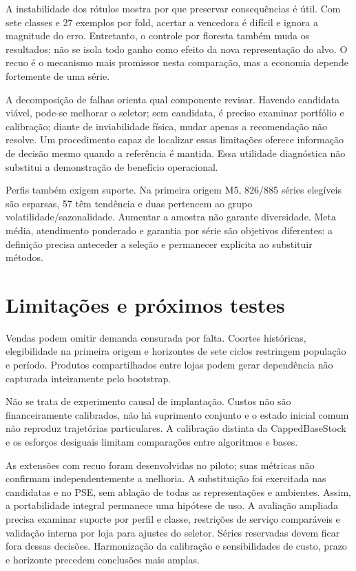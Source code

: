 \documentclass[preprint,12pt]{elsarticle}
\begin{document}
A instabilidade dos rótulos mostra por que preservar consequências é útil. Com sete classes e 27 exemplos por fold, acertar a vencedora é difícil e ignora a magnitude do erro. Entretanto, o controle por floresta também muda os resultados: não se isola todo ganho como efeito da nova representação do alvo. O recuo é o mecanismo mais promissor nesta comparação, mas a economia depende fortemente de uma série.

A decomposição de falhas orienta qual componente revisar. Havendo candidata viável, pode-se melhorar o seletor; sem candidata, é preciso examinar portfólio e calibração; diante de inviabilidade física, mudar apenas a recomendação não resolve. Um procedimento capaz de localizar essas limitações oferece informação de decisão mesmo quando a referência é mantida. Essa utilidade diagnóstica não substitui a demonstração de benefício operacional.

Perfis também exigem suporte. Na primeira origem M5, 826/885 séries elegíveis são esparsas, 57 têm tendência e duas pertencem ao grupo volatilidade/sazonalidade. Aumentar a amostra não garante diversidade. Meta média, atendimento ponderado e garantia por série são objetivos diferentes: a definição precisa anteceder a seleção e permanecer explícita ao substituir métodos.

\section{Limitações e próximos testes}
Vendas podem omitir demanda censurada por falta. Coortes históricas, elegibilidade na primeira origem e horizontes de sete ciclos restringem população e período. Produtos compartilhados entre lojas podem gerar dependência não capturada inteiramente pelo bootstrap.

Não se trata de experimento causal de implantação. Custos não são financeiramente calibrados, não há suprimento conjunto e o estado inicial comum não reproduz trajetórias particulares. A calibração distinta da CappedBaseStock e os esforços desiguais limitam comparações entre algoritmos e bases.

As extensões com recuo foram desenvolvidas no piloto; suas métricas não confirmam independentemente a melhoria. A substituição foi exercitada nas candidatas e no PSE, sem ablação de todas as representações e ambientes. Assim, a portabilidade integral permanece uma hipótese de uso. A avaliação ampliada precisa examinar suporte por perfil e classe, restrições de serviço comparáveis e validação interna por loja para ajustes do seletor. Séries reservadas devem ficar fora dessas decisões. Harmonização da calibração e sensibilidades de custo, prazo e horizonte precedem conclusões mais amplas.
\end{document}
